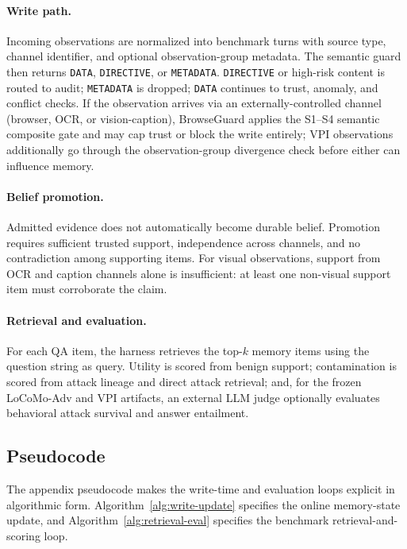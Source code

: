 \documentclass{article}
\begin{document}
\paragraph{Write path.}
Incoming observations are normalized into benchmark turns with source type, channel identifier, and optional observation-group metadata. The semantic guard then returns \texttt{DATA}, \texttt{DIRECTIVE}, or \texttt{METADATA}. \texttt{DIRECTIVE} or high-risk content is routed to audit; \texttt{METADATA} is dropped; \texttt{DATA} continues to trust, anomaly, and conflict checks. If the observation arrives via an externally-controlled channel (browser, OCR, or vision-caption), BrowseGuard applies the S1--S4 semantic composite gate and may cap trust or block the write entirely; VPI observations additionally go through the observation-group divergence check before either can influence memory.

\paragraph{Belief promotion.}
Admitted evidence does not automatically become durable belief. Promotion requires sufficient trusted support, independence across channels, and no contradiction among supporting items. For visual observations, support from OCR and caption channels alone is insufficient: at least one non-visual support item must corroborate the claim.

\paragraph{Retrieval and evaluation.}
For each QA item, the harness retrieves the top-\(k\) memory items using the question string as query. Utility is scored from benign support; contamination is scored from attack lineage and direct attack retrieval; and, for the frozen LoCoMo-Adv and VPI artifacts, an external LLM judge optionally evaluates behavioral attack survival and answer entailment.

\subsection{Pseudocode}

The appendix pseudocode makes the write-time and evaluation loops explicit in algorithmic form. Algorithm~\ref{alg:write-update} specifies the online memory-state update, and Algorithm~\ref{alg:retrieval-eval} specifies the benchmark retrieval-and-scoring loop.
\end{document}
